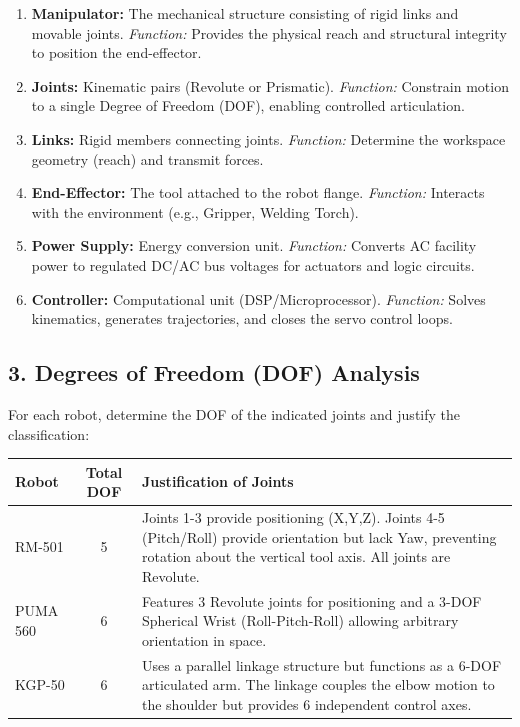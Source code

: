 \documentclass[11pt, a4paper]{article}
\begin{document}
\begin{enumerate}
    \item \textbf{Manipulator:} The mechanical structure consisting of rigid links and movable joints. \textit{Function:} Provides the physical reach and structural integrity to position the end-effector.
    \item \textbf{Joints:} Kinematic pairs (Revolute or Prismatic). \textit{Function:} Constrain motion to a single Degree of Freedom (DOF), enabling controlled articulation.
    \item \textbf{Links:} Rigid members connecting joints. \textit{Function:} Determine the workspace geometry (reach) and transmit forces.
    \item \textbf{End-Effector:} The tool attached to the robot flange. \textit{Function:} Interacts with the environment (e.g., Gripper, Welding Torch).
    \item \textbf{Power Supply:} Energy conversion unit. \textit{Function:} Converts AC facility power to regulated DC/AC bus voltages for actuators and logic circuits.
    \item \textbf{Controller:} Computational unit (DSP/Microprocessor). \textit{Function:} Solves kinematics, generates trajectories, and closes the servo control loops.
\end{enumerate}

\subsection*{3. Degrees of Freedom (DOF) Analysis}
For each robot, determine the DOF of the indicated joints and justify the classification:
\begin{table}[h]
    \centering
    \begin{tabular}{|l|c|p{8cm}|}
        \hline
        \textbf{Robot} & \textbf{Total DOF} & \textbf{Justification of Joints} \\
        \hline
        RM-501 & 5 & Joints 1-3 provide positioning (X,Y,Z). Joints 4-5 (Pitch/Roll) provide orientation but lack Yaw, preventing rotation about the vertical tool axis. All joints are Revolute. \\
        \hline
        PUMA 560 & 6 & Features 3 Revolute joints for positioning and a 3-DOF Spherical Wrist (Roll-Pitch-Roll) allowing arbitrary orientation in space. \\
        \hline
        KGP-50 & 6 & Uses a parallel linkage structure but functions as a 6-DOF articulated arm. The linkage couples the elbow motion to the shoulder but provides 6 independent control axes. \\
        \hline
    \end{tabular}
\end{table}
\end{document}
